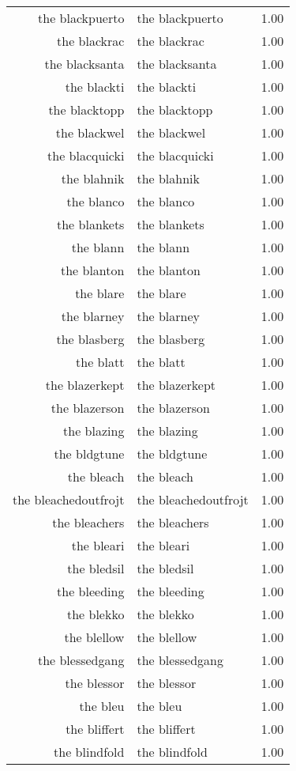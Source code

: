 \begin{table}[ht]
\begin{tabular}{rlr}
  the blackpuerto & the blackpuerto & 1.00 \\ 
  the blackrac & the blackrac & 1.00 \\ 
  the blacksanta & the blacksanta & 1.00 \\ 
  the blackti & the blackti & 1.00 \\ 
  the blacktopp & the blacktopp & 1.00 \\ 
  the blackwel & the blackwel & 1.00 \\ 
  the blacquicki & the blacquicki & 1.00 \\ 
  the blahnik & the blahnik & 1.00 \\ 
  the blanco & the blanco & 1.00 \\ 
  the blankets & the blankets & 1.00 \\ 
  the blann & the blann & 1.00 \\ 
  the blanton & the blanton & 1.00 \\ 
  the blare & the blare & 1.00 \\ 
  the blarney & the blarney & 1.00 \\ 
  the blasberg & the blasberg & 1.00 \\ 
  the blatt & the blatt & 1.00 \\ 
  the blazerkept & the blazerkept & 1.00 \\ 
  the blazerson & the blazerson & 1.00 \\ 
  the blazing & the blazing & 1.00 \\ 
  the bldgtune & the bldgtune & 1.00 \\ 
  the bleach & the bleach & 1.00 \\ 
  the bleachedoutfrojt & the bleachedoutfrojt & 1.00 \\ 
  the bleachers & the bleachers & 1.00 \\ 
  the bleari & the bleari & 1.00 \\ 
  the bledsil & the bledsil & 1.00 \\ 
  the bleeding & the bleeding & 1.00 \\ 
  the blekko & the blekko & 1.00 \\ 
  the blellow & the blellow & 1.00 \\ 
  the blessedgang & the blessedgang & 1.00 \\ 
  the blessor & the blessor & 1.00 \\ 
  the bleu & the bleu & 1.00 \\ 
  the bliffert & the bliffert & 1.00 \\ 
  the blindfold & the blindfold & 1.00 \\ 

\end{tabular}
\end{table}
